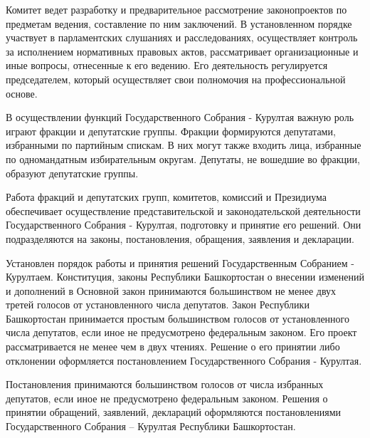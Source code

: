 Комитет ведет разработку и предварительное рассмотрение законопроектов по предметам ведения, составление по ним заключений. В установленном порядке участвует в парламентских слушаниях и расследованиях, осуществляет контроль за исполнением нормативных правовых актов, рассматривает организационные и иные вопросы, отнесенные к его ведению. Его деятельность регулируется председателем, который осуществляет свои полномочия на профессиональной основе.

В осуществлении функций Государственного Собрания - Курултая важную роль играют фракции и депутатские группы. Фракции формируются депутатами, избранными по партийным спискам. В них могут также входить лица, избранные по одномандатным избирательным округам. Депутаты, не вошедшие во фракции, образуют депутатские группы.

Работа фракций и депутатских групп, комитетов, комиссий и Президиума обеспечивает осуществление представительской и законодательской деятельности Государственного Собрания - Курултая, подготовку и принятие его решений. Они подразделяются на законы, постановления, обращения, заявления и декларации.

Установлен порядок работы и принятия решений Государственным Собранием - Курултаем. Конституция, законы Республики Башкортостан о внесении изменений и дополнений в Основной закон принимаются большинством не менее двух третей голосов от установленного числа депутатов. Закон Республики Башкортостан принимается простым большинством голосов от установленного числа депутатов, если иное не предусмотрено федеральным законом. Его проект рассматривается не менее чем в двух чтениях. Решение о его принятии либо отклонении оформляется постановлением Государственного Собрания - Курултая.

Постановления принимаются большинством голосов от числа избранных депутатов, если иное не предусмотрено федеральным законом. Решения о принятии обращений, заявлений, деклараций оформляются постановлениями Государственного Собрания – Курултая Республики Башкортостан.




